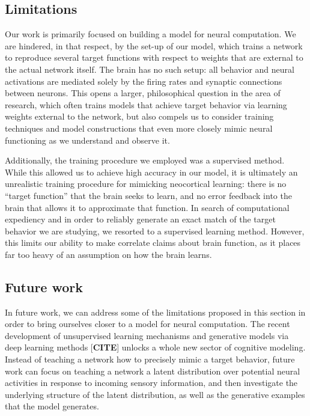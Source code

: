 \documentclass[12pt,a4paper,final]{iopart}
\begin{document}
\subsection{Limitations}
Our work is primarily focused on building a model for neural computation. We are hindered, in that respect, by the set-up of our model, which trains a network to reproduce several target functions with respect to weights that are external to the actual network itself. The brain has no such setup: all behavior and neural activations are mediated solely by the firing rates and synaptic connections between neurons. This opens a larger, philosophical question in the area of research, which often trains models that achieve target behavior via learning weights external to the network, but also compels us to consider training techniques and model constructions that even more closely mimic neural functioning as we understand and observe it. 

Additionally, the training procedure we employed was a supervised method. While this allowed us to achieve high accuracy in our model, it is ultimately an unrealistic training procedure for mimicking neocortical learning: there is no ``target function'' that the brain seeks to learn, and no error feedback into the brain that allows it to approximate that function. In search of computational expediency and in order to reliably generate an exact match of the target behavior we are studying, we resorted to a supervised learning method. However, this limits our ability to make correlate claims about brain function, as it places far too heavy of an assumption on how the brain learns. 

\subsection{Future work}
In future work, we can address some of the limitations proposed in this section in order to bring ourselves closer to a model for neural computation. The recent development of unsupervised learning mechanisms and generative models via deep learning methods [\textbf{CITE}] unlocks a whole new sector of cognitive modeling. Instead of teaching a network how to precisely mimic a target behavior, future work can focus on teaching a network a latent distribution over potential neural activities in response to incoming sensory information, and then investigate the underlying structure of the latent distribution, as well as the generative examples that the model generates.
\end{document}
